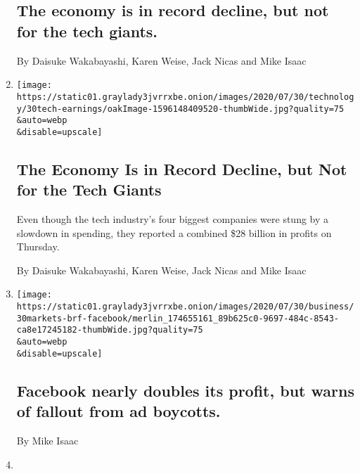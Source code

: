 \begin{enumerate}
  \hypertarget{the-economy-is-in-record-decline-but-not-for-the-tech-giants}{%
  \subsection{The economy is in record decline, but not for the tech
  giants.}\label{the-economy-is-in-record-decline-but-not-for-the-tech-giants}}

  By Daisuke Wakabayashi, Karen Weise, Jack Nicas and Mike Isaac
\item
  \href{/2020/07/30/technology/tech-company-earnings-amazon-apple-facebook-google.html}{}

  \texttt{[image: https://static01.graylady3jvrrxbe.onion/images/2020/07/30/technology/30tech-earnings/oakImage-1596148409520-thumbWide.jpg?quality=75\\\&auto=webp\\\&disable=upscale]}

  \hypertarget{the-economy-is-in-record-decline-but-not-for-the-tech-giants-1}{%
  \subsection{The Economy Is in Record Decline, but Not for the Tech
  Giants}\label{the-economy-is-in-record-decline-but-not-for-the-tech-giants-1}}

  Even though the tech industry's four biggest companies were stung by a
  slowdown in spending, they reported a combined \$28 billion in profits
  on Thursday.

  By Daisuke Wakabayashi, Karen Weise, Jack Nicas and Mike Isaac
\item
  \href{/live/2020/07/30/business/stock-market-today-coronavirus/facebook-nearly-doubles-its-profit-but-warns-of-fallout-from-ad-boycotts}{}

  \texttt{[image: https://static01.graylady3jvrrxbe.onion/images/2020/07/30/business/30markets-brf-facebook/merlin\_174655161\_89b625c0-9697-484c-8543-ca8e17245182-thumbWide.jpg?quality=75\\\&auto=webp\\\&disable=upscale]}

  \hypertarget{facebook-nearly-doubles-its-profit-but-warns-of-fallout-from-ad-boycotts}{%
  \subsection{Facebook nearly doubles its profit, but warns of fallout
  from ad
  boycotts.}\label{facebook-nearly-doubles-its-profit-but-warns-of-fallout-from-ad-boycotts}}

  By Mike Isaac
\item
  \href{/live/2020/07/29/technology/tech-ceos-hearing-testimony/tech-executives-looked-like-they-work-in-well-tech-offices}{}


\end{enumerate}
